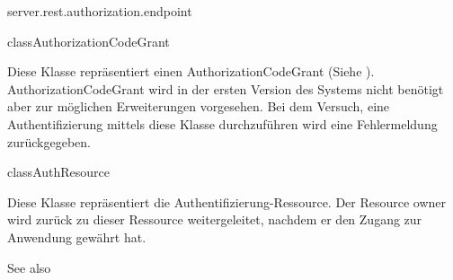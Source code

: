 \begin{texdocpackage}{server.rest.authorization.endpoint}
\label{texdoclet:edu.kit.informatik.studyplan.server.rest.authorization.endpoint}

\begin{texdocclass}{class}{AuthorizationCodeGrant}
\label{texdoclet:edu.kit.informatik.studyplan.server.rest.authorization.endpoint.AuthorizationCodeGrant}
\begin{texdocclassintro}
Diese Klasse repräsentiert einen AuthorizationCodeGrant   (Siehe \cite[Kap. 1.3.1]{rfc6749}).
 AuthorizationCodeGrant wird in der ersten Version des Systems nicht benötigt aber zur möglichen
 Erweiterungen vorgesehen.
 Bei dem Versuch, eine Authentifizierung mittels diese Klasse durchzuführen wird eine Fehlermeldung
 zurückgegeben.\end{texdocclassintro}
\begin{texdocclassconstructors}
\end{texdocclassconstructors}
\begin{texdocclassmethods}
\end{texdocclassmethods}
\end{texdocclass}


\begin{texdocclass}{class}{AuthResource}
\label{texdoclet:edu.kit.informatik.studyplan.server.rest.authorization.endpoint.AuthResource}
\begin{texdocclassintro}
Diese Klasse repräsentiert die Authentifizierung-Ressource.
 Der Resource owner wird zurück zu dieser Ressource weitergeleitet, nachdem er 
 den Zugang zur Anwendung gewährt hat.\end{texdocclassintro}
\begin{texdocclassconstructors}
\end{texdocclassconstructors}
\begin{texdocclassmethods}
\begin{texdocsees}{See also}
\end{texdocsees}


\end{texdocclassmethods}
\end{texdocclass}
\end{texdocpackage}
